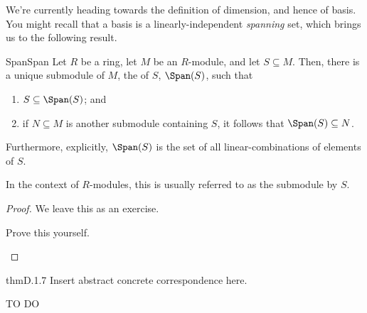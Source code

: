 We're currently heading towards the definition of dimension, and hence of basis.  You might recall that a basis is a linearly-independent \emph{spanning} set, which brings us to the following result.
\begin{thm}{Span}{Span}
	Let $R$ be a ring, let $M$ be an $R$-module, and let $S\subseteq M$.  Then, there is a unique submodule of $M$, the  of $S$, $\Span (S)$, such that
	\begin{enumerate}
		\item $S\subseteq \Span (S)$; and
		\item if $N\subseteq M$ is another submodule containing $S$, it follows that $\Span (S)\subseteq N$.
	\end{enumerate}
	Furthermore, explicitly, $\Span (S)$ is the set of all linear-combinations of elements of $S$.
	\begin{rmk}
		In the context of $R$-modules, this is usually referred to as the submodule  by $S$.
	\end{rmk}
	\begin{proof}
		We leave this as an exercise.
		\begin{exr}[breakable=false]{}{}
			Prove this yourself.
		\end{exr}
	\end{proof}
\end{thm}

\begin{thm}{}{thmD.1.7}
Insert abstract concrete correspondence here.

TO DO
\end{thm}